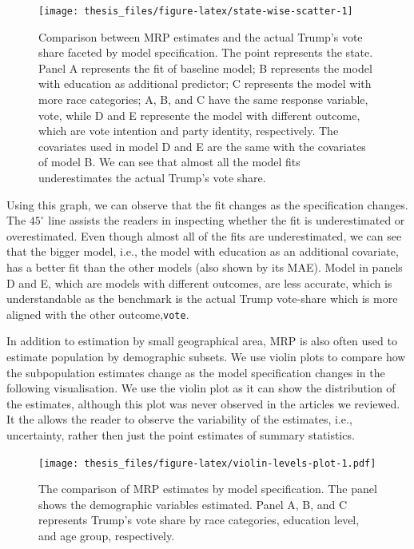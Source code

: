 \documentclass{monashthesis}
\begin{document}
\begin{figure}

\texttt{[image: thesis\_files/figure-latex/state-wise-scatter-1]} \hfill{}

\caption{Comparison between MRP estimates and the actual Trump's vote share faceted by model specification. The point represents the state. Panel A represents the fit of baseline model; B represents the model with education as additional predictor; C represents the model with more race categories; A, B, and C have the same response variable, vote, while D and E represente the model with different outcome, which are vote intention and party identity, respectively. The covariates used in model D and E are the same with the covariates of model B. We can see that almost all the model fits underestimates the actual Trump's vote share.}\label{fig:state-wise-scatter}
\end{figure}

Using this graph, we can observe that the fit changes as the specification changes. The \(45^{\circ}\) line assists the readers in inspecting whether the fit is underestimated or overestimated. Even though almost all of the fits are underestimated, we can see that the bigger model, i.e., the model with education as an additional covariate, has a better fit than the other models (also shown by its MAE). Model in panels D and E, which are models with different outcomes, are less accurate, which is understandable as the benchmark is the actual Trump vote-share which is more aligned with the other outcome,\texttt{vote}.

In addition to estimation by small geographical area, MRP is also often used to estimate population by demographic subsets. We use violin plots to compare how the subpopulation estimates change as the model specification changes in the following visualisation. We use the violin plot as it can show the distribution of the estimates, although this plot was never observed in the articles we reviewed. It the allows the reader to observe the variability of the estimates, i.e., uncertainty, rather then just the point estimates of summary statistics.

\begin{figure}
\centering
\texttt{[image: thesis\_files/figure-latex/violin-levels-plot-1.pdf]}
\caption{\label{fig:violin-levels-plot}The comparison of MRP estimates by model specification. The panel shows the demographic variables estimated. Panel A, B, and C represents Trump's vote share by race categories, education level, and age group, respectively.}
\end{figure}
\end{document}
